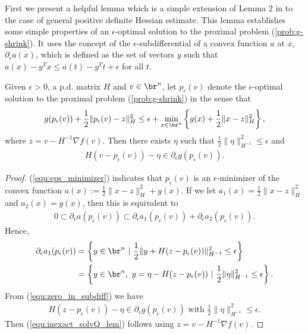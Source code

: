 \documentclass[11pt]{article}
\numberwithin{equation}{section}
\begin{document}
First we present a helpful lemma which is a simple extension of Lemma 2 in \cite{Schmidtetal} to the case of general positive definite Hessian estimate. This lemma establishes some simple properties of an $\epsilon$-optimal solution to the proximal problem (\ref{prob:g-shrink}).  It uses the concept of the $\epsilon$-subdifferential of a convex function $a$ at $x$, 
$\partial_{\epsilon} a(x)$, which is defined as the set of vectors $y$ such that $a(x) - y^Tx \leq a(t) - y^Tt + \epsilon$ for all $t$. 
\begin{lemma}
    \label{lem:inexact_1st_opt_cond}
    Given $\epsilon >0$, a p.d. matrix $H$ and $v\in \br^n$, let $p_{\epsilon}(v)$ denote the $\epsilon$-optimal solution to the proximal problem (\ref{prob:g-shrink}) in the sense that
    \begin{align}
        \label{equ:eps_minimizer}
        g(p_{\epsilon}(v))+\frac{1}{2}\|p_{\epsilon}(v)-z\|_H^2 \leq \epsilon +
        \min_{x\in\br^n}\left\{g(x)+\frac{1}{2}\|x-z\|_H^2 \right\},
    \end{align}
    where $z = v - H^{-1} \nabla f(v)$. Then there exists $\eta$ such that $\frac{1}{2} \| \eta \|^2_{H^{-1}} \leq \epsilon$ and
    \begin{align}
        \label{equ:inexact_solvQ_lem}
        H(v-p_{\epsilon}(v))  - \eta \in \partial_{\epsilon}g(p_{\epsilon}(v)).
    \end{align}
\end{lemma}


\begin{proof}
    (\ref{equ:eps_minimizer}) indicates that $p_{\epsilon}(v)$ is an $\epsilon$-minimizer of the convex function $a(x) := \frac{1}{2}\|x-z\|_H^2+g(x)$. If we let $a_1(x) = \frac{1}{2}\|x-z\|_H^2$ and $a_2(x) = g(x)$, then this is equivalent to
    \begin{align}
        \label{equ:zero_in_subdiff}
        0 \subset \partial_{\epsilon} a(p_{\epsilon}(v)) \subset \partial_{\epsilon} a_1(p_{\epsilon}(v)) + \partial_{\epsilon} a_2(p_{\epsilon}(v)).
    \end{align}
    Hence,
    \begin{align*}
        \partial_{\epsilon} a_1(p_{\epsilon}(v)) &= \left\{ y \in \br^n ~|~ \frac{1}{2} \| y + H(z-p_{\epsilon}(v)) \|^2_{H^{-1}} \leq \epsilon \right\} \\
        &= \left\{ y \in \br^n, ~y = \eta - H(z-p_{\epsilon}(v)) ~|~ \frac{1}{2} \|\eta\|^2_{H^{-1}} \leq \epsilon \right\}.
    \end{align*}
    From (\ref{equ:zero_in_subdiff}) we have
    \begin{align}
        H(z-p_{\epsilon}(v)) - \eta \in \partial_{\epsilon}g(p_{\epsilon}(v)) \mbox{ with } \frac{1}{2} \|\eta\|^2_{H^{-1}} \leq \epsilon.
    \end{align}
    Then (\ref{equ:inexact_solvQ_lem}) follows using $z = v - H^{-1} \nabla f(v)$.
\end{proof}
\end{document}
